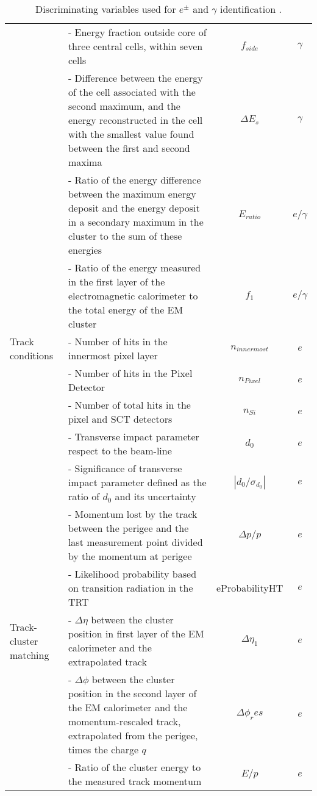 \documentclass[a4paper, oneside, 11pt, openright]{book}
\begin{document}
\begin{center}
\begin{table}
{\begin{tabular}{lp{12cm}cc}
								& - Energy fraction outside core of three central cells, within seven cells & $f_{side}$ & $\gamma$ \\
								& - Difference between the energy of the cell associated with the second maximum, and the energy reconstructed in the cell with the smallest value found between the first and second maxima & $\Delta E_s$ & $\gamma$ \\
								& - Ratio of the energy difference between the maximum energy deposit and the energy deposit in a secondary maximum in the cluster to the sum of these energies & $E_{ratio}$ & $e/\gamma$ \\
								& - Ratio of the energy measured in the first layer of the electromagnetic calorimeter to the total energy of the EM cluster & $f_1$ & $e/\gamma$ \\
								\midrule
								Track conditions
								& - Number of hits in the innermost pixel layer & $n_{innermost}$ & $e$ \\
								& - Number of hits in the Pixel Detector & $n_{Pixel}$ & $e$ \\
								& - Number of total hits in the pixel and SCT detectors & $n_{Si}$ & $e$ \\
								& - Transverse impact parameter  respect to the beam-line & $d_0$ & $e$ \\
								& - Significance of transverse impact parameter defined as the ratio of $d_0$ and its uncertainty & $|d_0/\sigma_{d_0}|$ & $e$ \\
								& - Momentum lost by the track between the perigee and the last measurement point divided by the momentum at perigee & $\Delta p/p$ & $e$ \\ 
								& - Likelihood probability based on transition radiation in the TRT & eProbabilityHT  & $e$ \\
								\midrule
								Track-cluster matching
								& - $\Delta \eta$ between the cluster position in first layer of the EM calorimeter and the extrapolated track & $\Delta \eta_1$ & $e$ \\
								& - $\Delta \phi$ between the cluster position in the second layer of the EM calorimeter and the momentum-rescaled track, extrapolated from the perigee, times the charge $q$ & $\Delta \phi_res$ & $e$ \\
								& - Ratio of the cluster energy to the measured track momentum & $E/p$ & $e$ \\
								\bottomrule[1.5pt]
						\end{tabular}}
						\caption{Discriminating variables used for $e^{\pm}$ and $\gamma$ identification \cite{Aad_2019}.}
						\label{tab:parameters}
					\end{table}
				\end{center} 
\end{document}
